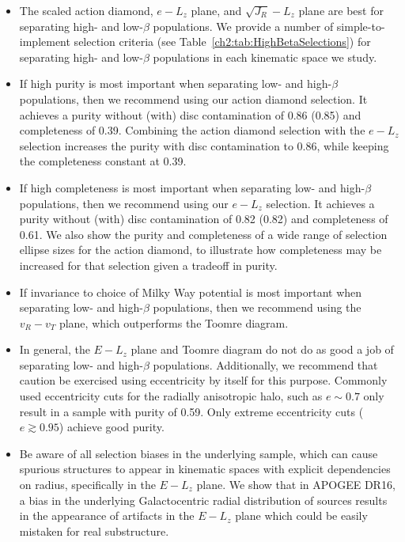 \begin{itemize}
    \item The scaled action diamond, $e-L_{z}$ plane, and $\sqrt{J_{R}}-L_{z}$ plane are best for separating high- and low-$\beta$ populations. We provide a number of simple-to-implement selection criteria (see Table~\ref{ch2:tab:HighBetaSelections}) for separating high- and low-$\beta$ populations in each kinematic space we study.
    
	\item If high purity is most important when separating low- and high-$\beta$ populations, then we recommend using our action diamond selection. It achieves a purity without (with) disc contamination of 0.86 (0.85) and completeness of 0.39. Combining the action diamond selection with the $e-L_{z}$ selection increases the purity with disc contamination to 0.86, while keeping the completeness constant at 0.39.
    
    \item If high completeness is most important when separating low- and high-$\beta$ populations, then we recommend using our $e-L_{z}$ selection. It achieves a purity without (with) disc contamination of 0.82 (0.82) and completeness of 0.61. We also show the purity and completeness of a wide range of selection ellipse sizes for the action diamond, to illustrate how completeness may be increased for that selection given a tradeoff in purity.
   
    \item If invariance to choice of Milky Way potential is most important when separating low- and high-$\beta$ populations, then we recommend using the $v_{R}-v_{T}$ plane, which outperforms the Toomre diagram.
    
    \item In general, the $E-L_{z}$ plane and Toomre diagram do not do as good a job of separating low- and high-$\beta$ populations. Additionally, we recommend that caution be exercised using eccentricity by itself for this purpose. Commonly used eccentricity cuts for the radially anisotropic halo, such as $e\sim0.7$ only result in a sample with purity of 0.59. Only extreme eccentricity cuts ($e \gtrsim 0.95$) achieve good purity.
    
    \item Be aware of all selection biases in the underlying sample, which can cause spurious structures to appear in kinematic spaces with explicit dependencies on radius, specifically in the $E-L_{z}$ plane. We show that in APOGEE DR16, a bias in the underlying Galactocentric radial distribution of sources results in the appearance of artifacts in the $E-L_{z}$ plane which could be easily mistaken for real substructure.
\end{itemize}

